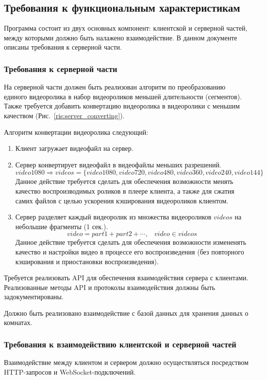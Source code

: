\subsection{Требования к функциональным характеристикам}

Программа состоит из двух основных компонент: клиентской и серверной частей, между которыми должно быть налажено
взаимодействие.
В данном документе описаны требования к серверной части.

\subsubsection{Требования к серверной части}
На серверной части должен быть реализован алгоритм по преобразованию единого видеоролика в набор видеороликов меньшей длительности
(сегментов).
Также требуется добавить конвертацию видеоролика в видеоролики с меньшим качеством (Рис.~\ref{ris:server_converting}).

Алгоритм конвертации видеоролика следующий:
\begin{enumerate}
    \item Клиент загружает видеофайл на сервер.
    \item Сервер конвертирует видеофайл в видеофайлы меньших разрешений.
    \[ video1080 \Rightarrow videos = \{ video1080, video720, video480, video360, video240, video144 \} \]
    Данное действие требуется сделать для обеспечения возможности менять качество воспроизводимых роликов в плеере клиента,
    а также для сжатия самих файлов с целью ускорения кэширования видеороликов клиентом.
    \item Сервер разделяет каждый видеоролик из множества видеороликов \(videos\) на небольшие фрагменты (1 сек.).
    \[ video = part1 + part2 + \cdots, \;\;\; video \in videos \]
    Данное действие требуется сделать для обеспечения возможности измененять качество и настройки видео в процессе его воспроизведения
    (без повторного кэширования и приостановки воспроизведения).
\end{enumerate}

Требуется реализовать API для обеспечения взаимодействия сервера с клиентами.
Реализованные методы API и протоколы взаимодействия должны быть задокументированы.

Должно быть реализовано взаимодействие с базой данных для хранения данных о комнатах.

\newpage

\subsubsection{Требования к взаимодействию клиентской и серверной частей}
Взаимодействие между клиентом и сервером должно осуществляться посредством HTTP-запросов и WebSocket-подключений.

